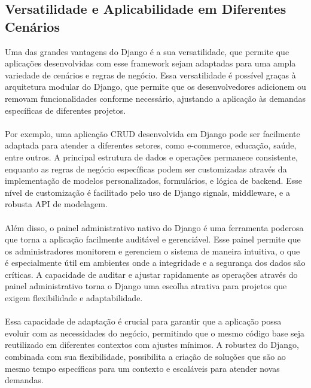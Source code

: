 \documentclass[11pt]{article} %
\begin{document}
\subsection{Versatilidade e Aplicabilidade em Diferentes Cenários}
Uma das grandes vantagens do Django é a sua versatilidade, que permite que aplicações desenvolvidas com esse framework sejam adaptadas para uma ampla variedade de cenários e regras de negócio. Essa versatilidade é possível graças à arquitetura modular do Django, que permite que os desenvolvedores adicionem ou removam funcionalidades conforme necessário, ajustando a aplicação às demandas específicas de diferentes projetos. 
\\\\
Por exemplo, uma aplicação CRUD desenvolvida em Django pode ser facilmente adaptada para atender a diferentes setores, como e-commerce, educação, saúde, entre outros. A principal estrutura de dados e operações permanece consistente, enquanto as regras de negócio específicas podem ser customizadas através da implementação de modelos personalizados, formulários, e lógica de backend. Esse nível de customização é facilitado pelo uso de Django signals, middleware, e a robusta API de modelagem. 
\\\\
Além disso, o painel administrativo nativo do Django é uma ferramenta poderosa que torna a aplicação facilmente auditável e gerenciável. Esse painel permite que os administradores monitorem e gerenciem o sistema de maneira intuitiva, o que é especialmente útil em ambientes onde a integridade e a segurança dos dados são críticas. A capacidade de auditar e ajustar rapidamente as operações através do painel administrativo torna o Django uma escolha atrativa para projetos que exigem flexibilidade e adaptabilidade.
\\\\
Essa capacidade de adaptação é crucial para garantir que a aplicação possa evoluir com as necessidades do negócio, permitindo que o mesmo código base seja reutilizado em diferentes contextos com ajustes mínimos. A robustez do Django, combinada com sua flexibilidade, possibilita a criação de soluções que são ao mesmo tempo específicas para um contexto e escaláveis para atender novas demandas.
\end{document}
